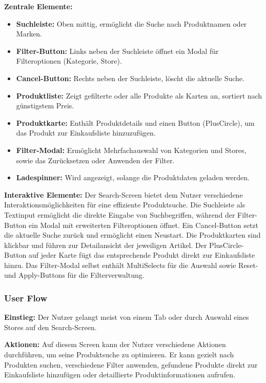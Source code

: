 \documentclass[12pt, a4paper]{report} %
\begin{document}
\textbf{Zentrale Elemente:}
\begin{itemize}
    \item \textbf{Suchleiste:} Oben mittig, ermöglicht die Suche nach Produktnamen oder Marken.
    \item \textbf{Filter-Button:} Links neben der Suchleiste öffnet ein Modal für Filteroptionen (Kategorie, Store).
    \item \textbf{Cancel-Button:} Rechts neben der Suchleiste, löscht die aktuelle Suche.
    \item \textbf{Produktliste:} Zeigt gefilterte oder alle Produkte als Karten an, sortiert nach günstigstem Preis.
    \item \textbf{Produktkarte:} Enthält Produktdetails und einen Button (PlusCircle), um das Produkt zur Einkaufsliste hinzuzufügen.
    \item \textbf{Filter-Modal:} Ermöglicht Mehrfachauswahl von Kategorien und Stores, sowie das Zurücksetzen oder Anwenden der Filter.
    \item \textbf{Ladespinner:} Wird angezeigt, solange die Produktdaten geladen werden.
\end{itemize}

\noindent\textbf{Interaktive Elemente:}
Der Search-Screen bietet dem Nutzer verschiedene Interaktionsmöglichkeiten für eine effiziente Produktsuche. Die Suchleiste als Textinput ermöglicht die direkte Eingabe von Suchbegriffen, während der Filter-Button ein Modal mit erweiterten Filteroptionen öffnet. Ein Cancel-Button setzt die aktuelle Suche zurück und ermöglicht einen Neustart. Die Produktkarten sind klickbar und führen zur Detailansicht der jeweiligen Artikel. Der PlusCircle-Button auf jeder Karte fügt das entsprechende Produkt direkt zur Einkaufsliste hinzu. Das Filter-Modal selbst enthält MultiSelects für die Auswahl sowie Reset- und Apply-Buttons für die Filterverwaltung.

\subsubsection{User Flow}
\textbf{Einstieg:} Der Nutzer gelangt meist von einem Tab oder durch Auswahl eines Stores auf den Search-Screen.

\noindent\textbf{Aktionen:} Auf diesem Screen kann der Nutzer verschiedene Aktionen durchführen, um seine Produktsuche zu optimieren. Er kann gezielt nach Produkten suchen, verschiedene Filter anwenden, gefundene Produkte direkt zur Einkaufsliste hinzufügen oder detaillierte Produktinformationen aufrufen.
\end{document}
